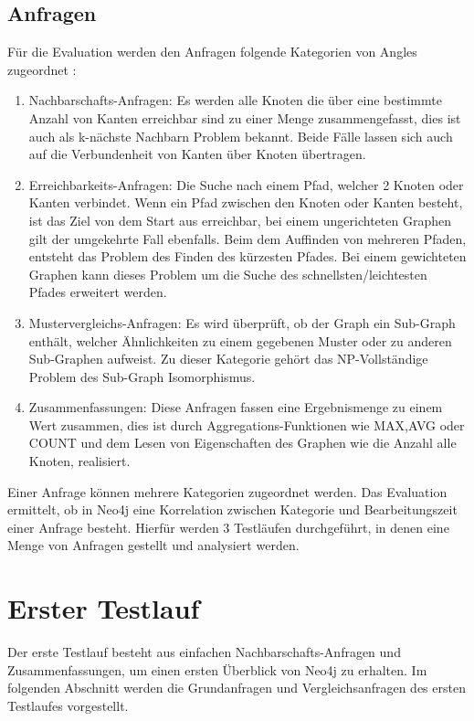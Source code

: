 \subsection{Anfragen} \label{Kategorien}
Für die Evaluation werden den Anfragen folgende Kategorien von Angles zugeordnet \parencite{angles2012comparison}:  
\begin{enumerate}
	\item Nachbarschafts-Anfragen: Es werden alle Knoten die über eine bestimmte Anzahl von Kanten erreichbar sind zu einer Menge zusammengefasst, dies ist auch als k-nächste Nachbarn Problem bekannt. Beide Fälle lassen sich auch auf die Verbundenheit von Kanten über Knoten übertragen.
	\item Erreichbarkeits-Anfragen: Die Suche nach einem Pfad, welcher 2 Knoten oder Kanten verbindet. Wenn ein Pfad zwischen den Knoten oder Kanten besteht, ist das Ziel von dem Start aus erreichbar, bei einem ungerichteten Graphen gilt der umgekehrte Fall ebenfalls. Beim dem Auffinden von mehreren Pfaden, entsteht das Problem des Finden des kürzesten Pfades. Bei einem gewichteten Graphen kann dieses Problem um die Suche des schnellsten/leichtesten Pfades  erweitert werden. 
	\item Mustervergleichs-Anfragen: Es wird überprüft, ob der Graph ein Sub-Graph enthält, welcher Ähnlichkeiten zu einem gegebenen Muster oder zu anderen Sub-Graphen aufweist. Zu dieser Kategorie gehört das NP-Vollständige Problem des Sub-Graph Isomorphismus. 
	\item Zusammenfassungen: Diese Anfragen fassen eine Ergebnismenge zu einem Wert zusammen, dies ist durch Aggregations-Funktionen wie MAX,AVG oder COUNT und dem Lesen von Eigenschaften des Graphen wie die Anzahl alle Knoten, realisiert. 
\end{enumerate}
Einer Anfrage können mehrere Kategorien zugeordnet werden. Das Evaluation ermittelt, ob in Neo4j eine Korrelation zwischen Kategorie und Bearbeitungszeit einer Anfrage besteht. Hierfür werden 3 Testläufen durchgeführt, in denen eine Menge von Anfragen gestellt und analysiert werden. 
\section{Erster Testlauf}
Der erste Testlauf besteht aus einfachen Nachbarschafts-Anfragen und Zusammenfassungen, um einen ersten Überblick von Neo4j zu erhalten. Im folgenden Abschnitt werden die Grundanfragen und Vergleichsanfragen des ersten Testlaufes vorgestellt. 

